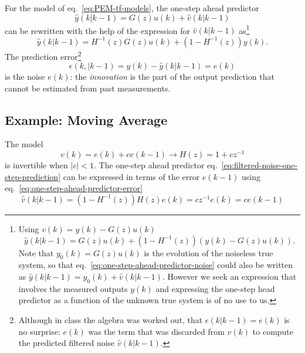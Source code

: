 For the model of eq.~\eqref{eq:PEM-tf-models}, the one-step ahead predictor
\begin{equation}
  \label{eq:one-step-ahead-predictor-noise}
  \hat{y}(k|k-1) = G(z)u(k) + \hat{v}(k|k-1)
\end{equation}
can be rewritten with the help of the expression for $\hat{v}(k|k-1)$ as\footnote{Using $v(k) = y(k) - G(z)u(k)$
  \begin{equation*}
    \hat{y}(k|k-1) = G(z)u(k) + \left(1-H^{-1}(z)\right)\left(y(k) - G(z)u(k)\right).
  \end{equation*}
Note that $y_0(k)=G(z)u(k)$ is the evolution of the noiseless true system, so that eq.~\eqref{eq:one-step-ahead-predictor-noise} could also be written as $\hat{y}(k|k-1) = y_0(k) + \hat{v}(k|k-1)$. However we seek an expression that involves the measured outputs $y(k)$ and expressing the one-step head predictor as a function of the unknown true system is of no use to us.\label{fn:noiseless-regressor}}
\begin{equation}
  \label{eq:one-step-ahead-predictor}
  \hat{y}(k|k-1) = H^{-1}(z)G(z)u(k) + \left(1-H^{-1}(z)\right) y(k).
\end{equation}
The prediction error\footnote{Although in class the algebra was worked out, that $\epsilon(k|k-1)=e(k)$ is no surprise: $e(k)$ was the term that was discarded from $v(k)$ to compute the predicted filtered noise $\hat{v}(k|k-1)$.}
\begin{equation}
  \label{eq:one-step-ahead-predictor-error}
  \epsilon(k,|k-1) = y(k) - \hat{y}(k|k-1) = e(k)
\end{equation}
is the noise $e(k)$: the \emph{innovation} is the part of the output prediction that cannot be estimated from past measurements.

\subsection{Example: Moving Average}

The model
\begin{equation*}
  v(k) = e(k) + ce(k-1) \rightarrow H(z) = 1+cz^{-1}
\end{equation*}
is invertible when $|c|<1$. The one-step ahead predictor eq.~\eqref{eq:filtered-noise-one-step-prediction} can be expressed in terms of the error $e(k-1)$ using eq.~\eqref{eq:one-step-ahead-predictor-error}
\begin{equation*}
  \hat{v}(k|k-1) = \left(1-H^{-1}(z)\right)H(z)e(k) = cz^{-1}e(k) =  ce(k-1)
\end{equation*}

